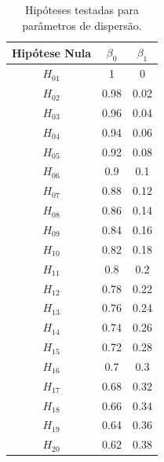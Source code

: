 \documentclass[AMA,STIX1COL]{WileyNJD-v2}
\begin{document}
\begin{table}[H]
\centering
\begin{tabular}{c|cc}
\hline
Hipótese Nula & $\beta_0$ & $\beta_1$ \\ \hline
$H_{01}$      & 1         & 0         \\
$H_{02}$      & 0.98      & 0.02      \\
$H_{03}$      & 0.96      & 0.04      \\
$H_{04}$      & 0.94      & 0.06      \\
$H_{05}$      & 0.92      & 0.08      \\
$H_{06}$      & 0.9       & 0.1       \\
$H_{07}$      & 0.88      & 0.12      \\
$H_{08}$      & 0.86      & 0.14      \\
$H_{09}$      & 0.84      & 0.16      \\
$H_{10}$      & 0.82      & 0.18      \\
$H_{11}$      & 0.8       & 0.2       \\
$H_{12}$      & 0.78      & 0.22      \\
$H_{13}$      & 0.76      & 0.24      \\
$H_{14}$      & 0.74      & 0.26      \\
$H_{15}$      & 0.72      & 0.28      \\
$H_{16}$      & 0.7       & 0.3       \\
$H_{17}$      & 0.68      & 0.32      \\
$H_{18}$      & 0.66      & 0.34      \\
$H_{19}$      & 0.64      & 0.36      \\
$H_{20}$      & 0.62      & 0.38      \\ \hline
\end{tabular}
\caption{Hipóteses testadas para parâmetros de dispersão.}
\label{tab:hipoteses_taus}
\end{table}

\end{document}
